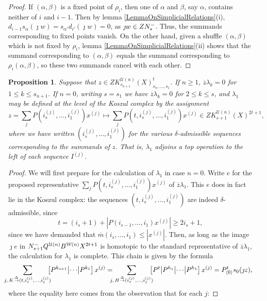 \documentclass[11pt]{amsart}
\theoremstyle{plain}
\newtheorem{prop}[thm]{Proposition}
\theoremstyle{definition}
\newcommand{\calU}{\mathcal{U}}
\newcommand{\calw}{\mathcal{W}}
\theoremstyle{plain}
\newcommand{\deltaalg}{\Delta} %
\newcommand{\minDimP}{\overline{m}}
\newcommand{\produces}[3]{#3:#1\sim #2}
\renewcommand{\produces}[3]{#1\rightarrow_{#3} #2}%
\renewcommand{\produces}[3]{#1\overset{\smash{#3}}{\rightarrow} #2}%
\newcommand{\Nop}{N^{\smash{-}}}
\begin{document}
\begin{Koszul complexes}
\begin{proof}
If $(\alpha,\beta)$ is a fixed point of $\rho_i$, then one of $\alpha$ and $\beta$, say $\alpha$, contains neither of $i$ and $i-1$. Then by lemma \ref{LemmaOnSimplicialRelations}(i), $d_{i-1}s_\alpha(\jmath w)=s_{\alpha'}d_{i'}(\jmath w)=0$, as $\jmath w\in Z\Nop_*$. Thus, the summands corresponding to fixed points vanish.
On the other hand, given a shuffle $(\alpha,\beta)$ which is not fixed by $\rho_i$, lemma \ref{LemmaOnSimplicialRelations}(ii) shows that the summand corresponding to $(\alpha,\beta)$ equals the summand corresponding to $\rho_i(\alpha,\beta)$, so these two summands cancel with each other.
\end{proof}
\begin{prop}\label{QkTrivial}
Suppose that $z\in ZK^{\calU(n)}_{s_{n+1}}(X)_{s_n,\ldots,s_1}^t$. If $n\geq1$, $\overline{z}\lambda_k=0$ for $1\leq k\leq {s_{n+1}}$. If $n=0$, writing $s=s_1$ we have $\overline{z}\lambda_k=0$ for $2\leq k\leq {s}$, and $\lambda_1$ may be defined at the level of the Koszul complex by the assignment
\[z=\textstyle\sum_{j}P(i_{s}^{(j)},\ldots,i_1^{(j)})x^{(j)}{\longmapsto}\textstyle\sum_{j}P(t,i_{s}^{(j)},\ldots,i_1^{(j)})x^{(j)}\in ZK^{\calU(n)}_{s+1}(X)^{2t+1},\]
where we have written $(i_{s}^{(j)},\ldots,i_1^{(j)})$ for the various $\delta$-admissible sequences corresponding to the summands of $z$. That is, $\lambda_1$ adjoins a top operation to the left of each sequence $I^{(j)}$.
\end{prop}
\begin{proof}
We will first prepare for the calculation of $\lambda_1$ in case $n=0$.
Write $e$ for the proposed representative $\sum_{j}P(t,i_{s}^{(j)},\ldots,i_1^{(j)})x^{(j)}$ of $\overline{z}\lambda_1$. This $e$ does in fact lie in the Koszul complex: the sequences $(t,i_{s}^{(j)},\ldots,i_1^{(j)})$ are indeed $\delta$-admissible, since
\[t=(i_{s}+1)+|P(i_{s-1},\ldots,i_1)x^{(j)}|\geq2i_{s}+1,\]
since we have demanded that $\minDimP(i_{s},\ldots,i_1)\leq|x^{(j)}|$. Then, as long as the image $\jmath e$ in $\Nop_{s+1}Q^{\calU(n)}B^{\calw(n)}X^{2t+1}$ is homotopic to the standard representative of $\overline{z}\lambda_1$, the calculation for $\lambda_1$ is complete. This chain is given by the formula
\[\!\!\!\!\sum_{j,\,\produces{K}{(t,i_{s}^{(j)},\ldots,i_1^{(j)})}{\deltaalg}}\!\!\!\!\left[P^{k_{s+1}} \middle|\cdots\middle|P^{k_1} \right]x^{(j)}
 =\!\!\!\!\sum_{j,\,\produces{H}{(i_{s}^{(j)},\ldots,i_1^{(j)})}{\deltaalg}}\!\!\!\!\left[P^t\middle|P^{h_{s}} \middle|\cdots\middle|P^{h_1} \right]x^{(j)}=P^{t}_{\langle 0\rangle}s_0(\jmath z),\]
where the equality here comes from the observation that for each $j$:

\end{proof}
\end{Koszul complexes}
\end{document}

